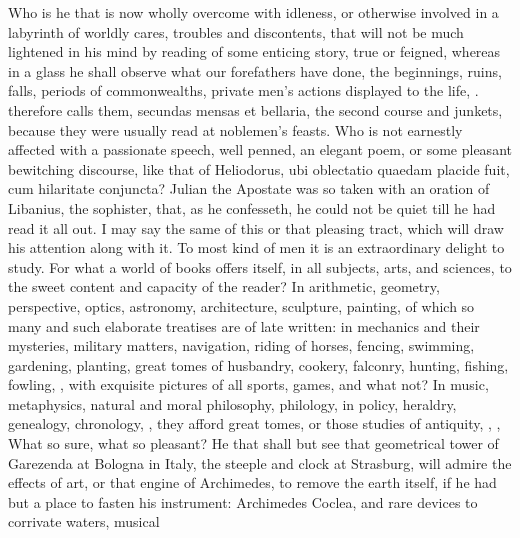{Who is he that is now wholly overcome with idleness, or otherwise
involved in a labyrinth of worldly cares, troubles and discontents,
that will not be much lightened in his mind by reading of some enticing
story, true or feigned, whereas in a glass he shall observe what our
forefathers have done, the beginnings, ruins, falls, periods of
commonwealths, private men's actions displayed to the life, \etc{}. 
\Plutarch therefore calls them, secundas mensas et bellaria, the second
course and junkets, because they were usually read at noblemen's
feasts. Who is not earnestly affected with a passionate speech, well
penned, an elegant poem, or some pleasant bewitching discourse, like
that of  Heliodorus, ubi oblectatio quaedam placide fuit, cum
hilaritate conjuncta? Julian the Apostate was so taken with an oration
of Libanius, the sophister, that, as he confesseth, he could not be
quiet till he had read it all out.  I may say the same of this
or that pleasing tract, which will draw his attention along with it. To
most kind of men it is an extraordinary delight to study. For what a
world of books offers itself, in all subjects, arts, and sciences, to
the sweet content and capacity of the reader? In arithmetic, geometry,
perspective, optics, astronomy, architecture, sculpture, painting, of
which so many and such elaborate treatises are of late written: in
mechanics and their mysteries, military matters, navigation,
riding of horses, fencing, swimming, gardening, planting,
great tomes of husbandry, cookery, falconry, hunting, fishing, fowling,
\etc{}, with exquisite pictures of all sports, games, and what not? In
music, metaphysics, natural and moral philosophy, philology, in policy,
heraldry, genealogy, chronology, \etc{}, they afford great tomes, or those
studies of antiquity, \etc{}, ,  What so sure,
what so pleasant? He that shall but see that geometrical tower of
Garezenda at Bologna in Italy, the steeple and clock at Strasburg, will
admire the effects of art, or that engine of Archimedes, to remove the
earth itself, if he had but a place to fasten his instrument:
Archimedes Coclea, and rare devices to corrivate waters, musical
}
